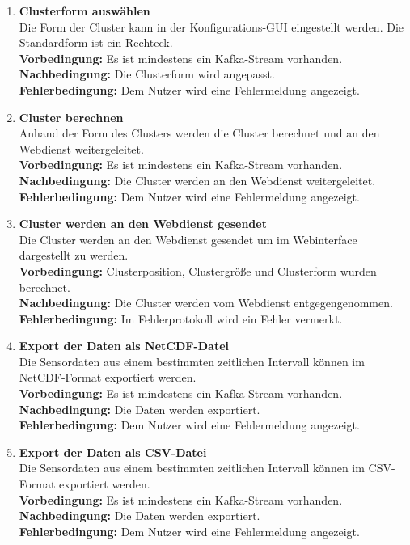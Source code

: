 \begin{enumerate}[label=\textbf{PF\arabic{enumi}0}]
	\item \textbf{Clusterform auswählen}\\
		Die Form der Cluster kann in der Konfigurations-GUI eingestellt werden. Die Standardform ist ein Rechteck.\\
		\textbf{Vorbedingung:} Es ist mindestens ein Kafka-Stream vorhanden.\\
		\textbf{Nachbedingung:} Die Clusterform wird angepasst.\\
		\textbf{Fehlerbedingung:} Dem Nutzer wird eine Fehlermeldung angezeigt.
		
	\item \textbf{Cluster berechnen} \label{Kachel}\\
		Anhand der Form des Clusters werden die Cluster berechnet und an den Webdienst weitergeleitet.\\
		\textbf{Vorbedingung:} Es ist mindestens ein Kafka-Stream vorhanden.\\
		\textbf{Nachbedingung:} Die Cluster werden an den Webdienst weitergeleitet.\\
		\textbf{Fehlerbedingung:} Dem Nutzer wird eine Fehlermeldung angezeigt.
	
	\item \textbf{Cluster werden an den Webdienst gesendet} \label{send}\\
		Die Cluster werden an den Webdienst gesendet um im Webinterface dargestellt zu werden.\\
		\textbf{Vorbedingung:} Clusterposition, Clustergröße und Clusterform wurden berechnet.\\
		\textbf{Nachbedingung:} Die Cluster werden vom Webdienst entgegengenommen.\\
		\textbf{Fehlerbedingung:} Im Fehlerprotokoll wird ein Fehler vermerkt.
	
	\item \textbf{Export der Daten als NetCDF-Datei} \label{netcdf}\\
		Die Sensordaten aus einem bestimmten zeitlichen Intervall können im NetCDF-Format exportiert werden.\\
		\textbf{Vorbedingung:} Es ist mindestens ein Kafka-Stream vorhanden.\\
		\textbf{Nachbedingung:} Die Daten werden exportiert.\\
		\textbf{Fehlerbedingung:} Dem Nutzer wird eine Fehlermeldung angezeigt.
	
	\item \textbf{Export der Daten als CSV-Datei} \label{CSV}\\
		Die Sensordaten aus einem bestimmten zeitlichen Intervall können im CSV-Format exportiert werden.\\
		\textbf{Vorbedingung:} Es ist mindestens ein Kafka-Stream vorhanden.\\
		\textbf{Nachbedingung:} Die Daten werden exportiert.\\
		\textbf{Fehlerbedingung:} Dem Nutzer wird eine Fehlermeldung angezeigt.
		

\end{enumerate}
